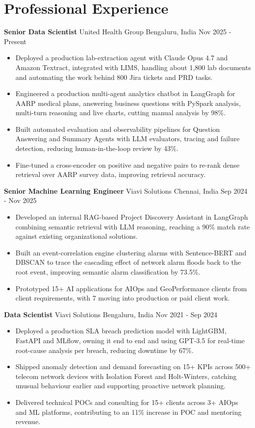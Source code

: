 \documentclass[10pt,a4paper]{article}
\newcommand{\role}[4]{\textbf{#1} \textbar{} #2 \hfill #3 \textbar{} #4\par}
\begin{document}
\section{Professional Experience}
\role{Senior Data Scientist}{United Health Group}{Bengaluru, India}{Nov 2025 - Present}
\begin{itemize}
  \item Deployed a production lab-extraction agent with Claude Opus 4.7 and Amazon Textract, integrated with LIMS, handling about 1,800 lab documents and automating the work behind 800 Jira tickets and PRD tasks.
  \item Engineered a production multi-agent analytics chatbot in LangGraph for AARP medical plans, answering business questions with PySpark analysis, multi-turn reasoning and live charts, cutting manual analysis by 98\%.
  \item Built automated evaluation and observability pipelines for Question Answering and Summary Agents with LLM evaluators, tracing and failure detection, reducing human-in-the-loop review by 43\%.
  \item Fine-tuned a cross-encoder on positive and negative pairs to re-rank dense retrieval over AARP survey data, improving retrieval accuracy.
\end{itemize}
\vspace{3pt}
\role{Senior Machine Learning Engineer}{Viavi Solutions}{Chennai, India}{Sep 2024 - Nov 2025}
\begin{itemize}
  \item Developed an internal RAG-based Project Discovery Assistant in LangGraph combining semantic retrieval with LLM reasoning, reaching a 90\% match rate against existing organizational solutions.
  \item Built an event-correlation engine clustering alarms with Sentence-BERT and DBSCAN to trace the cascading effect of network alarm floods back to the root event, improving semantic alarm classification by 73.5\%.
  \item Prototyped 15+ AI applications for AIOps and GeoPerformance clients from client requirements, with 7 moving into production or paid client work.
\end{itemize}
\vspace{3pt}
\role{Data Scientist}{Viavi Solutions}{Bengaluru, India}{Nov 2021 - Sep 2024}
\begin{itemize}
  \item Deployed a production SLA breach prediction model with LightGBM, FastAPI and MLflow, owning it end to end and using GPT-3.5 for real-time root-cause analysis per breach, reducing downtime by 67\%.
  \item Shipped anomaly detection and demand forecasting on 15+ KPIs across 500+ telecom network devices with Isolation Forest and Holt-Winters, catching unusual behaviour earlier and supporting proactive network planning.
  \item Delivered technical POCs and consulting for 15+ clients across 3+ AIOps and ML platforms, contributing to an 11\% increase in POC and mentoring revenue.
\end{itemize}
\end{document}
